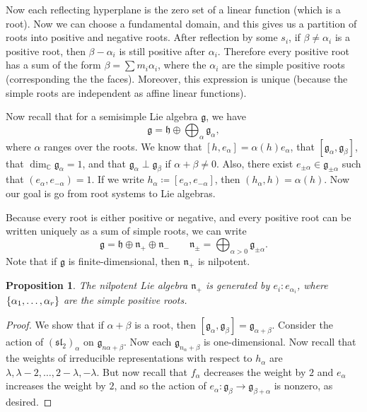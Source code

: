 \documentclass[leqno, openany]{memoir}
\newtheorem{prop}[thm]{Proposition}
\theoremstyle{definition}
\theoremstyle{remark}
\theoremstyle{plain}
\theoremstyle{definition}
\theoremstyle{remark}
\newcommand{\C}{\mathbb{C}}
\newcommand{\mf}[1]{\mathfrak{#1}}
\begin{document}
Now each reflecting hyperplane is the zero set of a linear function (which is a root). Now we can choose a fundamental domain, and this gives us a partition of roots into positive and negative roots. After reflection by some $s_i$, if $\beta \neq \alpha_i$ is a positive root, then $\beta - \alpha_i$ is still positive after $\alpha_i$. Therefore every positive root has a sum of the form $\beta = \sum m_i \alpha_i$, where the $\alpha_i$ are the simple positive roots (corresponding the the faces). Moreover, this expression is unique (because the simple roots are independent as affine linear functions).

Now recall that for a semisimple Lie algebra $\mf{g}$, we have
\[ \mf{g} = \mf{h} \oplus \bigoplus_{\alpha} \mf{g}_{\alpha}, \]
where $\alpha$ ranges over the roots. We know that $[h,e_{\alpha}] = \alpha(h) e_{\alpha}$, that $[\mf{g}_{\alpha}, \mf{g}_{\beta}]$, that $\dim_{\C} \mf{g}_{\alpha} = 1$, and that $\mf{g}_{\alpha} \perp \mf{g}_{\beta}$ if $\alpha + \beta \neq 0$. Also, there exist $e_{\pm \alpha} \in \mf{g}_{\pm \alpha}$ such that $(e_{\alpha}, e_{-\alpha}) = 1$. If we write $h_{\alpha} \coloneqq [e_{\alpha}, e_{-\alpha}]$, then $(h_{\alpha}, h) = \alpha(h)$. Now our goal is go from root systems to Lie algebras.

Because every root is either positive or negative, and every positive root can be written uniquely as a sum of simple roots, we can write 
\[ \mf{g} = \mf{h} \oplus \mf{n}_+ \oplus \mf{n}_- \qquad \mf{n}_{\pm} = \bigoplus_{\alpha > 0} \mf{g}_{\pm \alpha}. \]
Note that if $\mf{g}$ is finite-dimensional, then $\mf{n}_+$ is nilpotent.

\begin{prop}
    The nilpotent Lie algebra $\mf{n}_+$ is generated by $e_i \colon e_{\alpha_i}$, where $\qty{\alpha_1, \ldots, \alpha_r}$ are the simple positive roots.
\end{prop}

\begin{proof}
    We show that if $\alpha + \beta$ is a root, then $[\mf{g}_{\alpha}, \mf{g}_{\beta}] = \mf{g}_{\alpha + \beta}$. Consider the action of ${(\mf{sl}_2)}_{\alpha}$ on $\mf{g}_{n \alpha + \beta}$. Now each $\mf{g}_{n_{\alpha} + \beta}$ is one-dimensional. Now recall that the weights of irreducible representations with respect to $h_{\alpha}$ are $\lambda, \lambda - 2, \ldots, 2-\lambda, -\lambda$. But now recall that $f_{\alpha}$ decreases the weight by $2$ and $e_{\alpha}$ increases the weight by $2$, and so the action of $e_{\alpha} \colon \mf{g}_{\beta} \to \mf{g}_{\beta + \alpha}$ is nonzero, as desired.
\end{proof}
\end{document}
